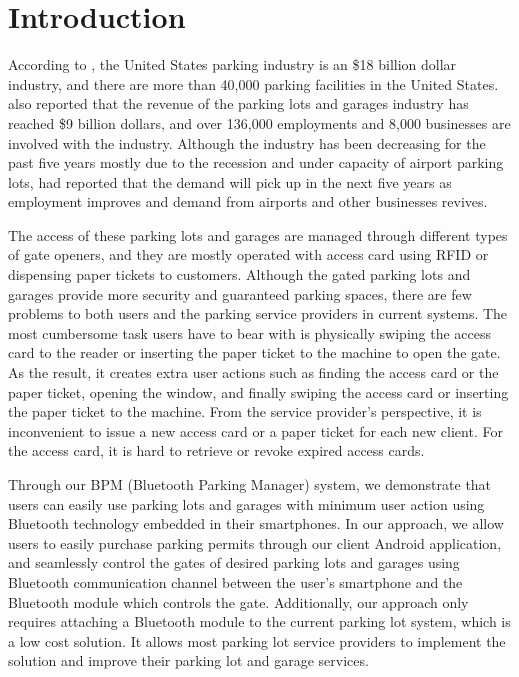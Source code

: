 \section{Introduction}

According to \cite{national}, the United States parking industry is an \$18 billion dollar industry, and there are more than 40,000 parking facilities in the United States. \cite{ibisworld} also reported that the revenue of the parking lots and garages industry has reached \$9 billion dollars, and over 136,000 employments and 8,000 businesses are involved with the industry. Although the industry has been decreasing for the past five years mostly due to the recession and under capacity of airport parking lots, \cite{ibisworld} had reported that the demand will pick up in the next five years as employment improves and demand from airports and other businesses revives. 

The access of these parking lots and garages are managed through different types of gate openers, and they are mostly operated with access card using RFID or dispensing paper tickets to customers. Although the gated parking lots and garages provide more security and guaranteed parking spaces, there are few problems to both users and the parking service providers in current systems. The most cumbersome task users have to bear with is physically swiping the access card to the reader or inserting the paper ticket to the machine to open the gate. As the result, it creates extra user actions such as finding the access card or the paper ticket, opening the window, and finally swiping the access card or inserting the paper ticket to the machine. From the service provider's perspective, it is inconvenient to issue a new access card or a paper ticket for each new client. For the access card, it is hard to retrieve or revoke expired access cards.

Through our BPM (Bluetooth Parking Manager) system, we demonstrate that users can easily use parking lots and garages with minimum user action using Bluetooth technology embedded in their smartphones. In our approach, we allow users to easily purchase parking permits through our client Android application, and seamlessly control the gates of desired parking lots and garages using Bluetooth communication channel between the user's smartphone and the Bluetooth module which controls the gate. Additionally, our approach only requires attaching a Bluetooth module to the current parking lot system, which is a low cost solution. It allows most parking lot service providers to implement the solution and improve their parking lot and garage services.